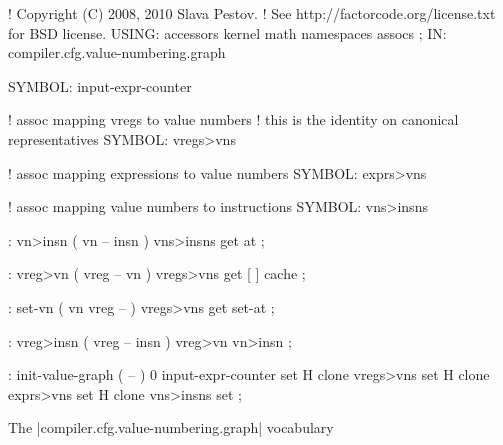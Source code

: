 \centering

  \begin{factorcode}
    ! Copyright (C) 2008, 2010 Slava Pestov.
    ! See http://factorcode.org/license.txt for BSD license.
    USING: accessors kernel math namespaces assocs ;
    IN: compiler.cfg.value-numbering.graph

    SYMBOL: input-expr-counter

    ! assoc mapping vregs to value numbers
    ! this is the identity on canonical representatives
    SYMBOL: vregs>vns

    ! assoc mapping expressions to value numbers
    SYMBOL: exprs>vns

    ! assoc mapping value numbers to instructions
    SYMBOL: vns>insns

    : vn>insn ( vn -- insn ) vns>insns get at ;

    : vreg>vn ( vreg -- vn ) vregs>vns get [ ] cache ;

    : set-vn ( vn vreg -- ) vregs>vns get set-at ;

    : vreg>insn ( vreg -- insn ) vreg>vn vn>insn ;

    : init-value-graph ( -- )
        0 input-expr-counter set
        H{ } clone vregs>vns set
        H{ } clone exprs>vns set
        H{ } clone vns>insns set ;
  \end{factorcode}

\caption{The \factor|compiler.cfg.value-numbering.graph| vocabulary}
